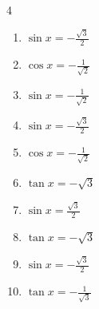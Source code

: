 \begin{multicols}{4}
\begin{enumerate}

  \item $\displaystyle \sin{x}  = -\frac{\sqrt{3}}{2}$


  \item $\displaystyle \cos{x}  = -\frac{1}{\sqrt{2}}$


  \item $\displaystyle \sin{x}  = -\frac{1}{\sqrt{2}}$


  \item $\displaystyle \sin{x}  = -\frac{\sqrt{3}}{2}$


  \item $\displaystyle \cos{x}  = -\frac{1}{\sqrt{2}}$


  \item $\displaystyle \tan{x}  = -\sqrt{3}$


  \item $\displaystyle \sin{x}  = \frac{\sqrt{3}}{2}$


\columnbreak %

  \item $\displaystyle \tan{x}  = -\sqrt{3}$


  \item $\displaystyle \sin{x}  = -\frac{\sqrt{3}}{2}$


  \item $\displaystyle \tan{x}  = -\frac{1}{\sqrt{3}}$



\end{enumerate}
\end{multicols}
